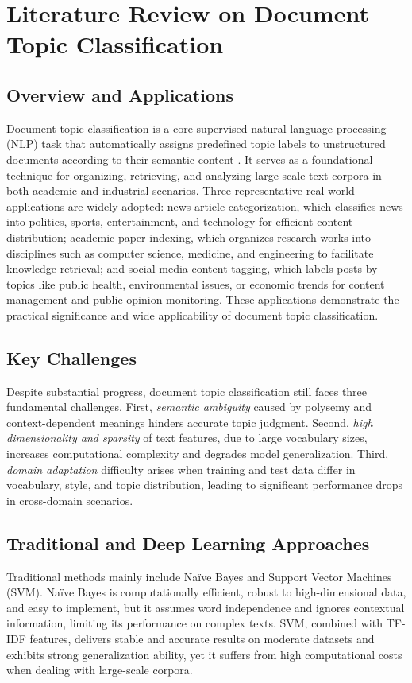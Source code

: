 \documentclass{article}
\begin{document}
\section{Literature Review on Document Topic Classification}

\subsection{Overview and Applications}
Document topic classification is a core supervised natural language processing (NLP) task that automatically assigns predefined topic labels to unstructured documents according to their semantic content \cite{jurafsky2023speech}. It serves as a foundational technique for organizing, retrieving, and analyzing large-scale text corpora in both academic and industrial scenarios. Three representative real-world applications are widely adopted: news article categorization, which classifies news into politics, sports, entertainment, and technology for efficient content distribution; academic paper indexing, which organizes research works into disciplines such as computer science, medicine, and engineering to facilitate knowledge retrieval; and social media content tagging, which labels posts by topics like public health, environmental issues, or economic trends for content management and public opinion monitoring. These applications demonstrate the practical significance and wide applicability of document topic classification.

\subsection{Key Challenges}
Despite substantial progress, document topic classification still faces three fundamental challenges. First, \textit{semantic ambiguity} caused by polysemy and context-dependent meanings hinders accurate topic judgment. Second, \textit{high dimensionality and sparsity} of text features, due to large vocabulary sizes, increases computational complexity and degrades model generalization. Third, \textit{domain adaptation} difficulty arises when training and test data differ in vocabulary, style, and topic distribution, leading to significant performance drops in cross-domain scenarios.

\subsection{Traditional and Deep Learning Approaches}
Traditional methods mainly include Na\"ive Bayes and Support Vector Machines (SVM). Na\"ive Bayes is computationally efficient, robust to high-dimensional data, and easy to implement, but it assumes word independence and ignores contextual information, limiting its performance on complex texts. SVM, combined with TF-IDF features, delivers stable and accurate results on moderate datasets and exhibits strong generalization ability, yet it suffers from high computational costs when dealing with large-scale corpora.
\end{document}
